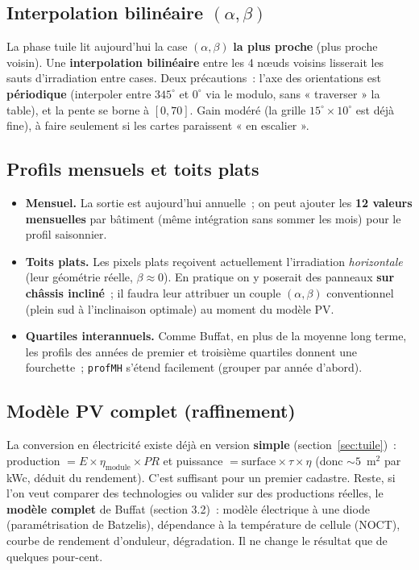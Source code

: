 \documentclass[11pt,a4paper]{article}
\newcommand{\fonction}[1]{\texttt{#1}}
\begin{document}
\subsection{Interpolation bilinéaire $(\alpha, \beta)$}

La phase tuile lit aujourd'hui la case $(\alpha,\beta)$ \textbf{la plus proche}
(plus proche voisin). Une \textbf{interpolation bilinéaire} entre les 4 nœuds
voisins lisserait les sauts d'irradiation entre cases. Deux précautions~: l'axe
des orientations est \textbf{périodique} (interpoler entre $345^\circ$ et
$0^\circ$ via le modulo, sans « traverser » la table), et la pente se borne à
$[0, 70]$. Gain modéré (la grille $15^\circ\times10^\circ$ est déjà fine), à
faire seulement si les cartes paraissent « en escalier ».

\subsection{Profils mensuels et toits plats}

\begin{itemize}
  \item \textbf{Mensuel.} La sortie est aujourd'hui annuelle~; on peut ajouter
    les \textbf{12 valeurs mensuelles} par bâtiment (même intégration sans sommer
    les mois) pour le profil saisonnier.
  \item \textbf{Toits plats.} Les pixels plats reçoivent actuellement
    l'irradiation \emph{horizontale} (leur géométrie réelle, $\beta\approx0$). En
    pratique on y poserait des panneaux \textbf{sur châssis incliné}~; il faudra
    leur attribuer un couple $(\alpha,\beta)$ conventionnel (plein sud à
    l'inclinaison optimale) au moment du modèle PV.
  \item \textbf{Quartiles interannuels.} Comme Buffat, en plus de la moyenne long
    terme, les profils des années de premier et troisième quartiles donnent une
    fourchette~; \fonction{profMH} s'étend facilement (grouper par année d'abord).
\end{itemize}

\subsection{Modèle PV complet (raffinement)}

La conversion en électricité existe déjà en version \textbf{simple}
(section~\ref{sec:tuile})~: production $= E \times \eta_{\text{module}} \times PR$
et puissance $= \text{surface} \times \tau \times \eta$ (donc $\sim 5$~m$^2$ par
kWc, déduit du rendement). C'est suffisant pour un premier cadastre. Reste, si
l'on veut comparer des technologies ou valider sur
des productions réelles, le \textbf{modèle complet} de Buffat (section 3.2)~:
modèle électrique à une diode (paramétrisation de Batzelis), dépendance à la
température de cellule (NOCT), courbe de rendement d'onduleur, dégradation. Il ne
change le résultat que de quelques pour-cent.
\end{document}
